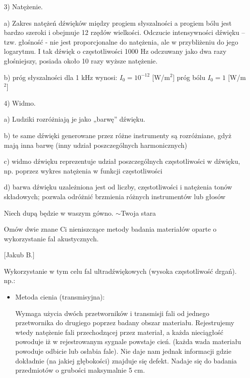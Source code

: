 \documentclass{article}
\begin{document}
\begin{enumerate}
3) Natężenie.

a) Zakres natężeń dźwięków między progiem słyszalności a progiem bólu jest bardzo szeroki i obejmuje 12 rzędów wielkości. Odczucie intensywności dźwięku – tzw. głośność - nie jest proporcjonalne do natężenia, ale w przybliżeniu do jego logarytmu. I tak dźwięk o częstotliwości 1000 Hz odczuwany jako dwa razy głośniejszy, posiada około 10 razy wyższe natężenie.

b) próg słyszalności dla 1 kHz wynosi:  $I_0=10^{-12}$ [W/m$^2$]
próg bólu 				    $I_0 = 1$  [W/m$^2$]

4) Widmo.

a) Ludziki rozróżniają je jako „barwę” dźwięku.

b) te same dźwięki generowane przez różne instrumenty są rozróżniane, gdyż mają inna barwę (inny udział poszczególnych harmonicznych)

c) widmo dźwięku reprezentuje udział poszczególnych częstotliwości w dźwięku, np. poprzez wykres natężenia w funkcji częstotliwości 

d) barwa dźwięku uzależniona jest od liczby, częstotliwości i natężenia tonów składowych; pozwala odróżnić brzmienia różnych instrumentów lub głosów 


\begin{flushright}
Niech dupą będzie w waszym gówno.
$\sim$Twoja stara
\end{flushright}












{\Large \bf  \item Omów dwie znane Ci nieniszczące metody badania materiałów oparte o
wykorzystanie fal akustycznych.} [Jakub B.]

 

Wykorzystanie w tym celu fal ultradźwiękowych (wysoka częstotliwość drgań).
np.:

\begin{itemize}
\item Metoda cienia (transmisyjna):

Wymaga użycia dwóch przetworników i transmisji fali od jednego przetwornika do drugiego poprzez badany obszar materiału. Rejestrujemy wtedy natężenie fali przechodzącej przez materiał, a każda nieciągłość powoduje iż w rejestrowanym sygnale powstaje cień. (każda wada materiału powoduje odbicie lub osłabia fale). Nie daje nam jednak informacji gdzie dokładnie (na jakiej głębokości) znajduje się defekt. Nadaje się do badania przedmiotów o grubości maksymalnie 5 cm. 


\end{itemize}
\end{enumerate}
\end{document}
